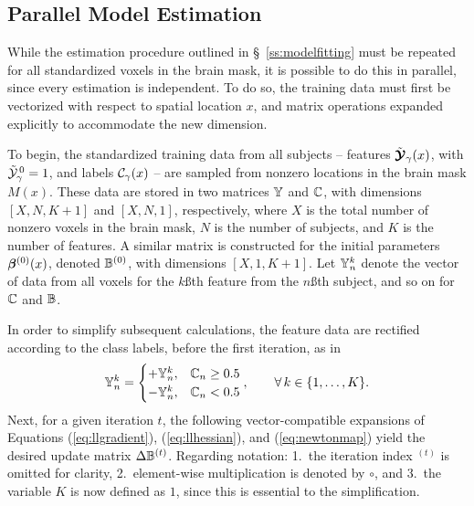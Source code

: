 \subsection{Parallel Model Estimation}\label{s:parallelfit}
While the estimation procedure outlined in \S~\ref{ss:modelfitting}
must be repeated for all standardized voxels in the brain mask,
it is possible to do this in parallel, since every estimation is independent.
To do so, the training data must first be vectorized with respect to spatial location $x$,
and matrix operations expanded explicitly to accommodate the new dimension.
\par
To begin, the standardized training data from all subjects
-- features $\tilde{\bm{\mathcal{Y}}}_{\gamma}(x)$, with $\tilde{\mathcal{Y}}_{\gamma}^{\thinspace0}=1$,
and labels $\mathcal{C}_{\gamma}(x)$ --
are sampled from nonzero locations in the brain mask $M(x)$.
These data are stored in two matrices $\mathbb{Y}$ and $\mathbb{C}$,
with dimensions $[X,N,K+1]$ and $[X,N,1]$, respectively, where
$X$ is the total number of nonzero voxels in the brain mask,
$N$ is the number of subjects, and
$K$ is the number of features.
A similar matrix is constructed for the initial parameters $\bm{\beta}^{(0)}(x)$, denoted $\mathbb{B}^{(0)}$,
with dimensions $[X,1,K+1]$.
Let $\mathbb{Y}_n^k$ denote the vector of data
from all voxels for the $k$\ss{th} feature from the $n$\ss{th} subject,
and so on for $\mathbb{C}$ and $\mathbb{B}$.
\par
In order to simplify subsequent calculations,
the feature data are rectified according to the class labels,
before the first iteration, as in
\begin{equation}
  \mathbb{Y}_n^k =
  \begin{cases}
    +\mathbb{Y}_n^k, & \mathbb{C}_n \ge 0.5\\
    -\mathbb{Y}_n^k, & \mathbb{C}_n  <  0.5\\
  \end{cases},\qquad\forall\thinspace k \in \{1,\dots,K\}.
\end{equation}
Next, for a given iteration $t$, the following vector-compatible expansions of Equations
(\ref{eq:llgradient}), (\ref{eq:llhessian}), and (\ref{eq:newtonmap})
yield the desired update matrix $\Delta\mathbb{B}^{(t)}$.
Regarding notation:
1.\ the iteration index ${}^{(t)}$ is omitted for clarity,
2.\ element-wise multiplication is denoted by $\circ$, and
3.\ the variable $K$ is now defined as $1$, since this is essential to the simplification.
\par

